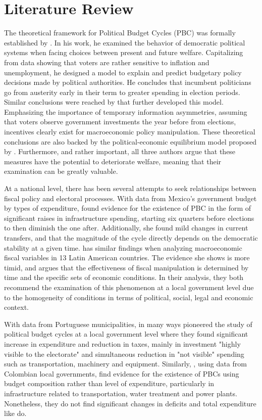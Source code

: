 \section{Literature Review}
The theoretical framework for Political Budget Cycles (PBC) was formally established by \textcite{nordhaus1975}. In his work, he examined the behavior of democratic political systems when facing choices between present and future welfare. Capitalizing from data showing that voters are rather sensitive to inflation and unemployment, he designed a model to explain and predict budgetary policy decisions made by political authorities. He concludes that incumbent politicians go from austerity early in their term to greater spending in election periods. Similar conclusions were reached by \textcite{rogoff1988} that further developed this model. Emphasizing the importance of temporary information asymmetries, assuming that voters observe government investments the year before from elections, incentives clearly exist for macroeconomic policy manipulation. These theoretical conclusions are also backed by the political-economic equilibrium model proposed by \textcite{drazen2010}. Furthermore, and rather important, all three authors argue that these measures have the potential to deteriorate welfare, meaning that their examination can be greatly valuable.

At a national level, there has been several attempts to seek relationships between fiscal policy and electoral processes. With data from Mexico's government budget by types of expenditure, \textcite{gonzalez2002} found evidence for the existence of PBC in the form of significant raises in infrastructure spending, starting six quarters before elections to then diminish the one after. Additionally, she found mild changes in current transfers, and that the magnitude of the cycle directly depends on the democratic stability at a given time. \textcite{lankaster2017} has similar findings when analyzing macroeconomic fiscal variables in 13 Latin American countries. The evidence she shows is more timid, and argues that the effectiveness of fiscal manipulation is determined by time and the specific sets of economic conditions. In their analysis, they both recommend the examination of this phenomenon at a local government level due to the homogeneity of conditions in terms of political, social, legal and economic context.

With data from Portuguese municipalities, \textcite{veiga2007} in many ways pioneered the study of political budget cycles at a local government level where they found significant increase in expenditure and reduction in taxes, mainly in investment "highly visible to the electorate" and simultaneous reduction in "not visible" spending such as transportation, machinery and equipment. Similarly, \textcite{drazen2010}, using data from Colombian local governments, find evidence for the existence of PBCs using budget composition rather than level of expenditure, particularly in infrastructure related to transportation, water treatment and power plants. Nonetheless, they do not find significant changes in deficits and total expenditure like \textcite{veiga2007} do.

